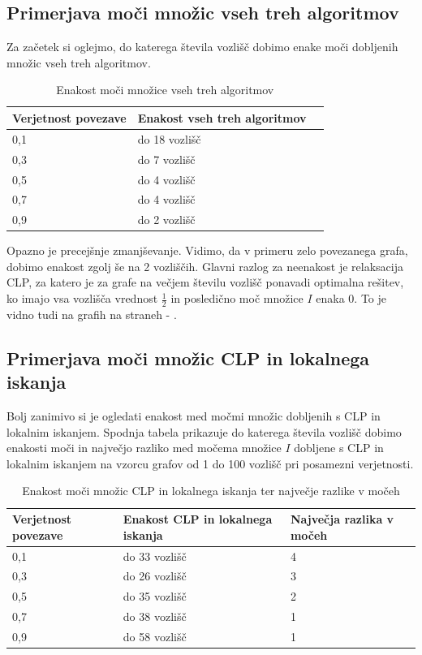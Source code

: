 \documentclass[a4paper, 12 pt]{article}
\theoremstyle{definition}
\theoremstyle{plain}
\theoremstyle{remark}
\begin{document}
\subsection{Primerjava moči množic vseh treh algoritmov}

Za začetek si oglejmo, do katerega števila vozlišč dobimo enake moči dobljenih množic vseh treh algoritmov.



\begin{table}[H]
\centering
\begin{tabular}{|p{2.1cm}|p{3.2cm}|p{6cm}|}
\hline
\textbf{Verjetnost povezave}  & \textbf{Enakost vseh treh algoritmov} \\ \hline
0,1    & do 18 vozlišč   \\ \hline
0,3    & do 7 vozlišč     \\ \hline
0,5    & do 4 vozlišč  \\ \hline
0,7    & do 4 vozlišč \\ \hline
0,9    & do 2 vozlišč    \\ \hline
\end{tabular}
\caption{Enakost moči množice vseh treh algoritmov}
\label{fig:enakost vseh treh} 
\end{table}

Opazno je precejšnje zmanjševanje. Vidimo, da v primeru zelo povezanega grafa, dobimo enakost zgolj še na 2 vozliščih. Glavni razlog za neenakost je relaksacija CLP, za katero je za grafe na večjem številu vozlišč ponavadi optimalna rešitev, ko imajo vsa vozlišča vrednost $\frac{1}{2}$ in posledično moč množice $I$ enaka 0. To je vidno tudi na grafih na straneh \pageref{fig:moc0,1} - \pageref{fig:moc0,9}.

\subsection{Primerjava moči množic CLP in lokalnega iskanja}

Bolj zanimivo si je ogledati enakost med močmi množic dobljenih s CLP in lokalnim iskanjem. Spodnja tabela prikazuje do katerega števila vozlišč dobimo enakosti moči in največjo razliko med močema množice $I$ dobljene s CLP in lokalnim iskanjem na vzorcu grafov od 1 do 100 vozlišč pri posamezni verjetnosti.

\begin{table}[H]
\centering
\begin{tabular}{|p{2.1cm}|p{3.7cm}|p{3.5cm}|}
\hline
\textbf{Verjetnost povezave}  & \textbf{Enakost CLP in lokalnega iskanja} & \textbf{Največja razlika v močeh} \\ \hline
0,1    & do 33 vozlišč &  4\\ \hline
0,3    & do 26 vozlišč  &  3   \\ \hline
0,5    & do 35 vozlišč &  2 \\ \hline
0,7    & do 38 vozlišč  &  1\\ \hline
0,9    & do 58 vozlišč  &  1  \\ \hline
\end{tabular}
\caption{Enakost moči množic CLP in lokalnega iskanja ter največje razlike v močeh}
\label{fig:enakost vseh treh} 
\end{table}
\end{document}
